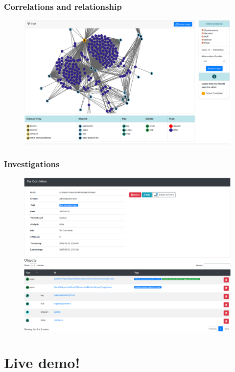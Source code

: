 \documentclass{beamer}
\begin{document}
\begin{frame}
    \frametitle{Correlations and relationship}
    \begin{figure}
        \includegraphics[scale=0.18, angle=0]{images/ail-correlation.png}
    \end{figure}
\end{frame}

\begin{frame}
    \frametitle{Investigations}
    \begin{figure}
        \includegraphics[scale=0.22, angle=0]{screenshot/investigation_mixer.png}
    \end{figure}
\end{frame}

\section{Live demo!}
\end{document}
